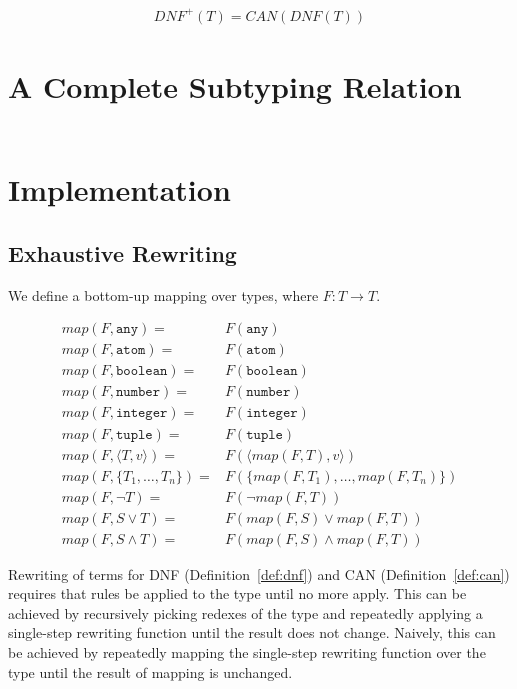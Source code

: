 \documentclass[nonacm,timestamp,manuscript]{acmart}
\newcommand{\atom}[1]{\texttt{#1}}
\newcommand{\singleton}[2]{\langle #1, #2 \rangle} %
\begin{document}
\begin{definition}
\begin{align*}
  {DNF}^{+}(T) = CAN(DNF(T))
\end{align*}
\end{definition}

\section{A Complete Subtyping Relation}

\begin{align*}
\end{align*}

\section{Implementation}

\subsection{Exhaustive Rewriting}
  
We define a bottom-up mapping over types, where $F : T \rightarrow T$.

\begin{align*}
  map(F, \atom{any}) ={}& F(\atom{any}) \\
  map(F, \atom{atom}) ={}& F(\atom{atom}) \\
  map(F, \atom{boolean}) ={}& F(\atom{boolean}) \\
  map(F, \atom{number}) ={}& F(\atom{number}) \\
  map(F, \atom{integer}) ={}& F(\atom{integer}) \\
  map(F, \atom{tuple}) = {}& F(\atom{tuple}) \\
  map(F, \singleton{T}{v}) ={}& F(\singleton{map(F, T)}{v}) \\
  map(F, \{ T_1, \ldots, T_n \}) ={}& F( \{ map(F, T_1), \ldots, map(F, T_n) \}) \\
  map(F, \neg T) ={}& F(\neg map(F, T)) \\
  map(F, S \lor T) ={}& F(map(F, S) \lor map(F, T)) \\
  map(F, S \land T) ={}& F(map(F, S) \land map(F, T))
\end{align*}


Rewriting of terms for DNF (Definition~\ref{def:dnf}) and CAN
(Definition~\ref{def:can}) requires that rules be applied to the type until no
more apply. This can be achieved by recursively picking redexes of the type
and repeatedly applying a single-step rewriting function until the result does
not change. Naively, this can be achieved by repeatedly mapping the single-step
rewriting function over the type until the result of mapping is unchanged.
\end{document}
